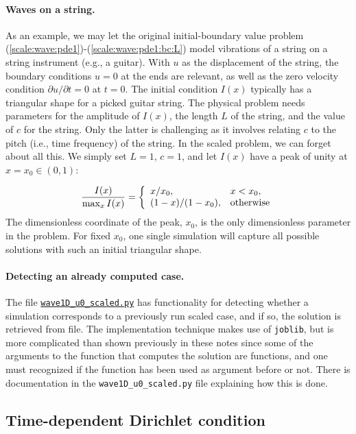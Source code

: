 \documentclass[graybox,envcountchap,sectrefs,final]{svmonodo}
\begin{document}
\paragraph{Waves on a string.}
As an example, we may let the original initial-boundary value problem
(\ref{scale:wave:pde1})-(\ref{scale:wave:pde1:bc:L}) model vibrations of
a string on a string instrument (e.g., a guitar).
With $u$ as the displacement of the
string, the boundary conditions $u=0$ at the ends are relevant, as
well as the zero velocity condition $\partial u/\partial t=0$ at
$t=0$.  The initial condition $I(x)$ typically has a triangular shape
for a picked guitar string.  The physical problem needs parameters for
the amplitude of $I(x)$, the length $L$ of the string, and the value
of $c$ for the string. Only the latter is challenging as it involves
relating $c$ to the pitch (i.e., time frequency) of the string. In the
scaled problem, we can forget about all this. We simply set $L=1$,
$c=1$, and let $I(x)$ have a peak of unity at $x=x_0\in(0,1)$:

\[
\frac{I(x)}{\max_x I(x)} = \left\lbrace
\begin{array}{ll}
x/x_0, & x < x_0,\\ 
(1-x)/(1-x_0), & \hbox{otherwise}
\end{array}\right.
\]
The dimensionless coordinate of the peak, $x_0$, is the only
dimensionless parameter in the problem. For fixed $x_0$,
one single simulation will capture all possible solutions with such
an initial triangular shape.


\paragraph{Detecting an already computed case.}
The file \href{{http://tinyurl.com/o8pb3yy/wave1D_u0_scaled.py}}{\nolinkurl{wave1D_u0_scaled.py}}
has functionality for detecting whether a simulation corresponds to
a previously run scaled case, and if so, the solution is retrieved from
file. The implementation technique makes use of \texttt{joblib}, but is more
complicated than shown previously in these notes since some of the
arguments to the function that computes the solution are functions,
and one must recognized if the function has been used as argument
before or not. There is documentation in the \Verb!wave1D_u0_scaled.py!
file explaining how this is done.


\subsection{Time-dependent Dirichlet condition}
\label{scale:wave:pde2}
\end{document}
